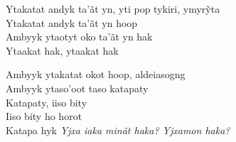 \begin{linenumbers}\begingroup\raggedright
  \noindent Ytakatat andyk ta’ãt yn, yti pop tykiri, ymyrỹta\\
  Ytakatat andyk ta'ãt yn hoop\\
  Ambyyk ytaotyt oko ta'ãt yn hak\\
  Ytaakat hak, ytaakat hak

\end{linenumbers}\endgroup

\bigskip

\begin{linenumbers}\begingroup\raggedright

\noindent   Ambyyk ytakatat okot hoop, aldeiasogng\\
  Ambyyk ytaso'oot taso katapaty\\
  Katapaty, iiso bity\\
  Iiso bity ho horot\\
  Katapa hyk
  \emph{Yjxa iaka minãt haka? Yjxamon haka?}

\end{linenumbers}\endgroup

\bigskip

